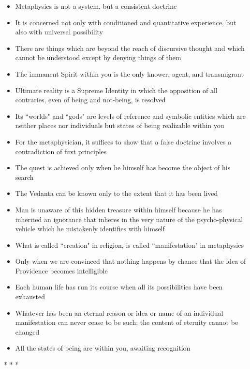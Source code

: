 \begin{itemize}
\item Metaphysics is not a system, but a consistent doctrine 
\item It is concerned not only with conditioned and quantitative experience, but also with universal possibility 
\item There are things which are beyond the reach of discursive thought and which cannot be understood except by denying things of them 
\item The immanent Spirit within you is the only knower, agent, and transmigrant 
\item Ultimate reality is a Supreme Identity in which the opposition of all contraries, even of being and not-being, is resolved 
\item Its ``worlds" and ``gods" are levels of reference and symbolic entities which are neither places nor individuals but states of being realizable within you 
\item For the metaphysician, it suffices to show that a false doctrine involves a contradiction of first principles 
\item The quest is achieved only when he himself has become the object of his search 
\item The Vedanta can be known only to the extent that it has been lived 
\item Man is unaware of this hidden treasure within himself because he has inherited an ignorance that inheres in the very nature of the psycho-physical vehicle which he mistakenly identifies with himself 
\item What is called ``creation" in religion, is called ``manifestation" in metaphysics 
\item Only when we are convinced that nothing happens by chance that the idea of Providence becomes intelligible 
\item Each human life has run its course when all its possibilities have been exhausted 
\item Whatever has been an eternal reason or idea or name of an individual manifestation can never cease to be such; the content of eternity cannot be changed 
\item All the states of being are within you, awaiting recognition 
\end{itemize}



\begin{center}* * *\end{center}

